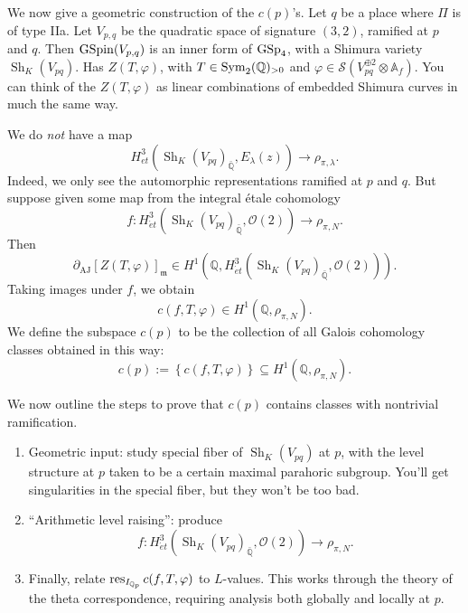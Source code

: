 \documentclass[reqno]{amsart} 
\begin{document}
We now give a geometric construction of the $c(p)$'s.  Let $q$ be a place where $\Pi$ is of type IIa.  Let $V_{p, q}$ be the quadratic space of signature $(3,2)$, ramified at $p$ and $q$.  Then $\operatorname{GSpin}(V_{p, q})$ is an inner form of $\operatorname{GSp}_4$, with a Shimura variety $\operatorname{Sh}_K(V_{p q})$.  Has $Z(T, \varphi)$, with $T \in \operatorname{Sym}_2(\mathbb{Q})_{> 0}$ and $\varphi \in \mathcal{S}(V_{p q}^{\oplus 2} \otimes \mathbb{A}_f)$.  You can think of the $Z(T, \varphi)$ as linear combinations of embedded Shimura curves in much the same way.

We do \emph{not} have a map
\begin{equation*}
  H_{et}^3(\operatorname{Sh}_K(V_{p q})_{\bar{\mathbb{Q}}}, E_\lambda(z)) \rightarrow \rho_{\pi, \lambda}.
\end{equation*}
Indeed, we only see the automorphic representations ramified at $p$ and $q$.  But suppose given some map from the integral {\'e}tale cohomology
\begin{equation*}
  f : H_{\acute{e}t}^3(\operatorname{Sh}_K(V_{p q})_{\bar{\mathbb{Q}}}, \mathcal{O}(2)) \rightarrow \rho_{\pi, N}.
\end{equation*}
Then
\begin{equation*}
  \partial_{\mathrm{AJ}}[Z(T, \varphi)]_{\mathfrak{m}} \in H^1(\mathbb{Q}, H_{\acute{e}t}^3(\operatorname{Sh}_K(V_{p q})_{\bar{\mathbb{Q}}}, \mathcal{O}(2))).
\end{equation*}
Taking images under $f$, we obtain
\begin{equation*}
  c(f, T, \varphi) \in H^1(\mathbb{Q}, \rho_{\pi, N}).
\end{equation*}
We define the subspace $c(p)$ to be the collection of all Galois cohomology classes obtained in this way:
\begin{equation*}
  c(p) := \left\{ c(f, T, \varphi) \right\} \subseteq H^1(\mathbb{Q}, \rho_{\pi, N}).
\end{equation*}

We now outline the steps to prove that $c(p)$ contains classes with nontrivial ramification.
\begin{enumerate}
\item\label{enumerate:cnpooo5mmc} Geometric input: study special fiber of $\operatorname{Sh}_K(V_{p q})$ at $p$, with the level structure at $p$ taken to be a certain maximal parahoric subgroup.  You'll get singularities in the special fiber, but they won't be too bad.
\item\label{enumerate:cnpooo5obe} ``Arithmetic level raising'': produce
  \begin{equation*}
    f : H_{\acute{e}t}^3(\operatorname{Sh}_K(V_{p q})_{\bar{\mathbb{Q}}}, \mathcal{O}(2)) \rightarrow \rho_{\pi, N}.
  \end{equation*}
\item\label{enumerate:cnpooo5pcd} Finally, relate $\operatorname{res}_{I_{\mathbb{Q}_p}} c(f, T, \varphi)$ to $L$-values.  This works through the theory of the theta correspondence, requiring analysis both globally and locally at $p$.
\end{enumerate}
\end{document}

